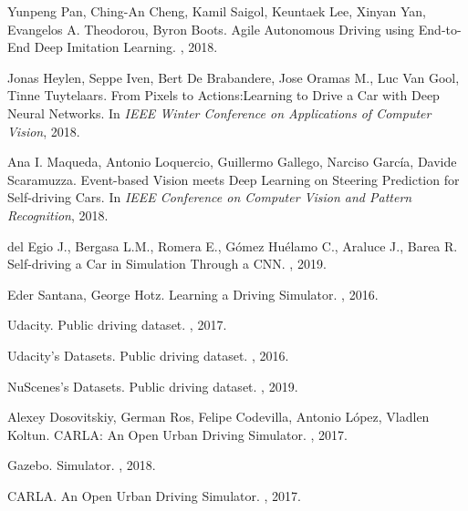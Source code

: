 \begin{thebibliography}{1}
Yunpeng Pan, Ching-An Cheng, Kamil Saigol, Keuntaek Lee, Xinyan Yan, Evangelos A. Theodorou, Byron Boots.
\newblock Agile Autonomous Driving using End-to-End Deep Imitation Learning.
, 2018.

Jonas Heylen, Seppe Iven, Bert De Brabandere, Jose Oramas M., Luc Van Gool, Tinne Tuytelaars.
\newblock From Pixels to Actions:Learning to Drive a Car with Deep Neural Networks.
\newblock In {\em IEEE Winter Conference on Applications of Computer Vision}, 2018.

Ana I. Maqueda, Antonio Loquercio, Guillermo Gallego, Narciso García, Davide Scaramuzza.
\newblock Event-based Vision meets Deep Learning on Steering Prediction for Self-driving Cars.
\newblock In {\em  IEEE Conference on Computer Vision and Pattern Recognition}, 2018.

del Egio J., Bergasa L.M., Romera E., Gómez Huélamo C., Araluce J., Barea R.
\newblock Self-driving a Car in Simulation Through a CNN.
, 2019.

Eder Santana, George Hotz.
\newblock Learning a Driving Simulator.
, 2016.

Udacity.
\newblock Public driving dataset.
, 2017.

Udacity's Datasets.
\newblock Public driving dataset.
, 2016.

NuScenes's Datasets.
\newblock Public driving dataset.
, 2019.

Alexey Dosovitskiy, German Ros, Felipe Codevilla, Antonio López, Vladlen Koltun.
\newblock CARLA: An Open Urban Driving Simulator.
, 2017.

Gazebo.
\newblock Simulator.
, 2018.

CARLA.
\newblock An Open Urban Driving Simulator.
, 2017.


\end{thebibliography}
